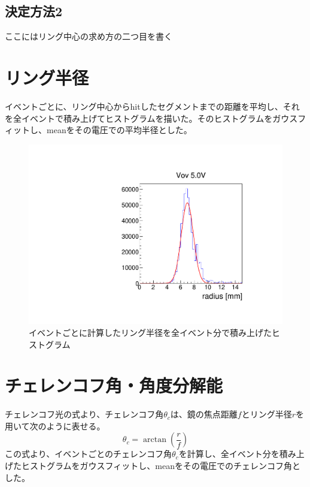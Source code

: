 \documentclass[uplatex, titlepage, dvipdfmx, 12pt, a4paper]{jsreport}
\begin{document}
    \subsection{決定方法2}
      ここにはリング中心の求め方の二つ目を書く

  \section{リング半径}
    イベントごとに、リング中心からhitしたセグメントまでの距離を平均し、それを全イベントで積み上げてヒストグラムを描いた。そのヒストグラムをガウスフィットし、meanをその電圧での平均半径とした。
    \begin{figure}[h]
      \begin{center} 
        \includegraphics[scale=0.5, clip]{image/radius.pdf}
        \caption{イベントごとに計算したリング半径を全イベント分で積み上げたヒストグラム} 
        \label{fig:5Vradius} 
      \end{center}
    \end{figure}
    
    
    
    \section{チェレンコフ角・角度分解能}
      チェレンコフ光の式より、チェレンコフ角$\theta_{c}$は、鏡の焦点距離$f$とリング半径$r$を用いて次のように表せる。
      \begin{equation}
        \theta_{c} = \arctan \left(\frac{r}{f} \right)
        \label{theta_radius}
      \end{equation}
      この式より、イベントごとのチェレンコフ角$\theta_{c}$を計算し、全イベント分を積み上げたヒストグラムをガウスフィットし、meanをその電圧でのチェレンコフ角とした。
\end{document}
